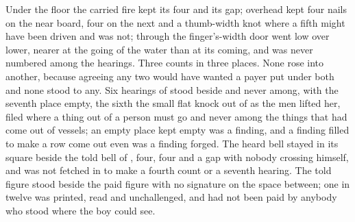 Under the floor the carried fire kept its four and its gap; overhead  kept four nails on the near board, four on the next and a thumb-width knot where a fifth might have been driven and was not; through the finger's-width door  went low over lower, nearer at the going of the water than at its coming, and was never numbered among the hearings. Three counts in three places. None rose into another, because agreeing any two would have wanted a payer put under both and none stood to any. Six hearings of  stood beside and never among, with the seventh place empty, the sixth the small flat knock out of  as the men lifted her, filed where a thing out of a person must go and never among the things that had come out of vessels; an empty place kept empty was a finding, and a finding filled to make a row come out even was a finding forged. The heard bell stayed in its square beside the told bell of , four, four and a gap with nobody crossing himself, and was not fetched in to make a fourth count or a seventh hearing. The told figure stood beside the paid figure with no signature on the space between; one in twelve was printed, read and unchallenged, and had not been paid by anybody who stood where the boy could see.


